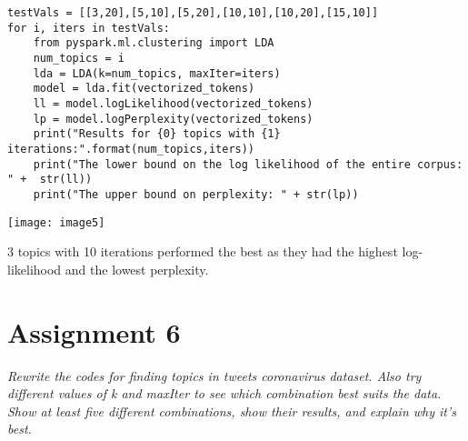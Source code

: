 \documentclass[]{article}
\begin{document}
\begin{verbatim}
testVals = [[3,20],[5,10],[5,20],[10,10],[10,20],[15,10]]
for i, iters in testVals:
	from pyspark.ml.clustering import LDA
	num_topics = i
	lda = LDA(k=num_topics, maxIter=iters)
	model = lda.fit(vectorized_tokens)
	ll = model.logLikelihood(vectorized_tokens)
	lp = model.logPerplexity(vectorized_tokens)
	print("Results for {0} topics with {1} iterations:".format(num_topics,iters))
	print("The lower bound on the log likelihood of the entire corpus: " +  str(ll))
	print("The upper bound on perplexity: " + str(lp))
\end{verbatim}
\texttt{[image: image5]} %

3 topics with 10 iterations performed the best as they had the highest log-likelihood and the lowest perplexity.

\section*{Assignment 6}
\emph{ Rewrite the codes for finding topics in tweets coronavirus dataset.  Also try different values of k and maxIter to see which combination best suits the data. Show at least five different combinations, show their results, and explain why it’s best.
 }
\end{document}
